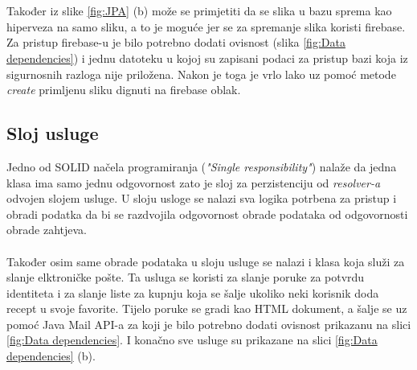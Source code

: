 \documentclass[times, utf8, zavrsni]{fer}
\begin{document}
\\\\
Također iz slike \ref{fig:JPA} (b) može se primjetiti da se slika u bazu sprema kao hiperveza na samo sliku, a to je moguće jer se za
spremanje slika koristi firebase. Za pristup firebase-u je bilo potrebno dodati ovisnost (slika \ref{fig:Data dependencies}) i jednu datoteku u kojoj su zapisani
podaci za pristup bazi koja iz sigurnosnih razloga nije priložena. Nakon je toga je vrlo lako uz pomoć metode \textit{create} primljenu
sliku dignuti na firebase oblak.

\subsection{Sloj usluge}
Jedno od SOLID načela programiranja (\textit{"Single responsibility"}) nalaže da jedna klasa ima samo jednu odgovornost
zato je sloj za perzistenciju od \textit{resolver-a} odvojen slojem usluge. U sloju usloge se nalazi sva logika
potrbena za pristup i obradi podatka da bi se razdvojila odgovornost obrade podataka od odgovornosti obrade zahtjeva.
\\\\
Također osim same obrade podataka u sloju usluge se nalazi i klasa koja služi za slanje elktroničke pošte.
Ta usluga se koristi za slanje poruke za potvrdu identiteta i za slanje liste za kupnju
koja se šalje ukoliko neki korisnik doda recept u svoje favorite. Tijelo poruke se gradi
kao HTML dokument, a šalje se uz pomoć Java Mail API-a za koji je bilo potrebno dodati ovisnost
prikazanu na slici \ref{fig:Data dependencies}. I konačno sve usluge su prikazane na slici \ref{fig:Data dependencies} (b).
\end{document}
